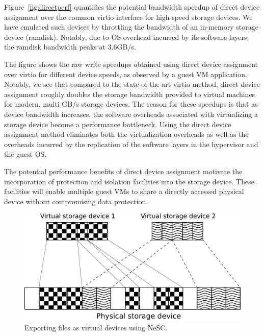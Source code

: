 Figure~\ref{fig:directperf} quantifies the potential bandwidth speedup of direct device assignment over the common virtio interface for high-speed storage devices. We have emulated such devices by throttling the bandwidth of an in-memory storage device (ramdisk). Notably, due to OS overhead incurred by its software layers, the ramdisk bandwidth peaks at 3.6GB/s.

The figure shows the raw write speedups obtained using direct device assignment over virtio for different device speeds, as observed by a guest VM application.
Notably, we see that compared to the state-of-the-art virtio method, direct device assignment roughly doubles the storage bandwidth provided to virtual machines for modern, multi GB/s storage devices.
The reason for these speedups is that as device bandwidth increases, the  software overheads associated with virtualizing a storage device become a performance bottleneck.
Using the direct device assignment method eliminates both the virtualization overheads as well as the overheads incurred by the replication of the software layers in the hypervisor and the guest OS.

The potential performance benefits of direct device assignment motivate the incorporation of protection and isolation facilities into the storage device. These facilities will enable multiple guest VMs to share a directly accessed physical device without compromising data protection.

\begin{figure}[t]
  \centering
  \includegraphics[width=\columnwidth]{figs/nesc-overview.pdf}
  \caption{Exporting files as virtual devices using NeSC.\label{fig:nesc_outline}}  
\end{figure}

